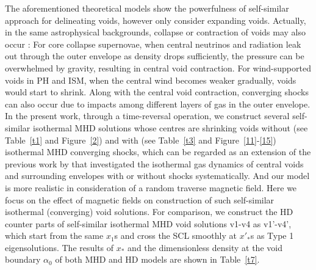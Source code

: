 \documentclass[fleqn,usenatbib]{mnras}
\begin{document}
The aforementioned theoretical models show the powerfulness of self-similar approach for delineating voids, however only consider expanding voids. Actually, in the same astrophysical backgrounds, collapse or contraction of voids may also occur \citep{lou2014self} : For core collapse supernovae, when central neutrinos and radiation leak out through the outer
envelope as density drops sufficiently, the pressure can be overwhelmed by gravity, resulting in central void contraction. For wind-supported voids in PH and ISM, when the central wind becomes weaker gradually, voids would start to shrink. Along with the central void contraction, converging shocks can also occur due to impacts among different layers of gas in the outer envelope. In the present work, through a time-reversal operation, we construct several self-similar isothermal MHD solutions whose centres are shrinking voids without (see Table~\ref{t1} and Figure~\ref{2}) and with (see Table~\ref{t3} and Figure~\ref{11}-\ref{15}) isothermal MHD converging shocks, which can be regarded as an extension of the previous work by \citet{lou2009dynamic} that investigated the isothermal gas dynamics of central voids and surrounding envelopes with or without shocks systematically. And our model is more realistic in consideration of a random traverse magnetic field. Here we focus on the effect of magnetic fields on construction of such self-similar isothermal (converging) void solutions. 
For comparison, we construct the HD counter parts of self-similar isothermal MHD void solutions v1-v4 as v1'-v4', which start from the same $x_{1}$s and cross the SCL smoothly at $x'_{*}$s as Type 1 eigensolutions. The results of $x_{*}$ and the dimensionless density at the void boundary $\alpha_{0}$ of both MHD and HD models are shown in Table~\ref{t7}.
\end{document}
